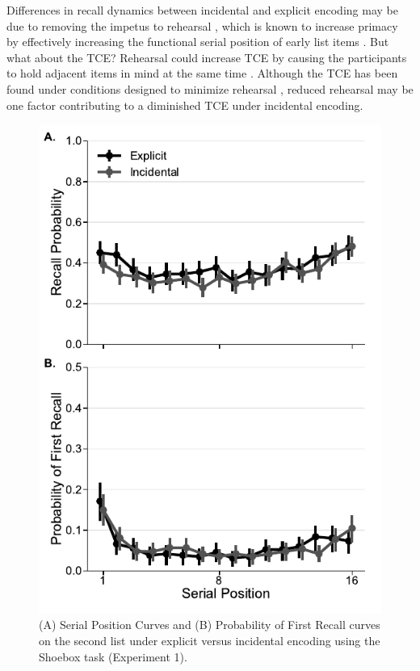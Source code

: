 \documentclass[man,natbib,floatsintext]{apa6} %
\begin{document}
Differences in recall dynamics between incidental and explicit encoding may be due to removing the impetus to rehearsal \citep{MarsWerd72,Neat93,GlenEtal80}, which is known to increase primacy by effectively increasing the  functional serial position of early list items \citep{Rund71,BrodMurd77,TanWard00}. But what about the TCE? Rehearsal could increase TCE by causing the participants to hold adjacent items in mind at the same time \cite{Hint16}. Although the TCE has been found under conditions designed to minimize rehearsal \citep{HowaKaha99}, reduced rehearsal may be one factor contributing to a diminished TCE under incidental encoding. 

\begin{figure}
\includegraphics{figures/E1_spc_list2.pdf}
\caption{(A) Serial Position Curves and (B) Probability of First Recall curves on the second list under explicit versus incidental encoding using the Shoebox task (Experiment 1). \spcpaneltext}
\label{e1_l2_spc}
\end{figure}
\end{document}
